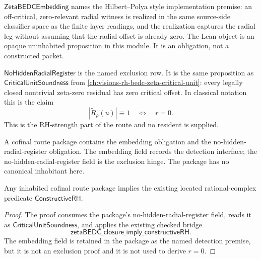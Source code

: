 \begin{definition}
\label{def:rh-layerwise-prime-cofinality-zeta-bedc-embedding}
$\mathsf{ZetaBEDCEmbedding}$ names the Hilbert--Polya style
implementation premise: an off-critical, zero-relevant radial witness is
realized in the same source-side classifier space as the finite layer
readings, and the realization captures the radial leg without assuming
that the radial offset is already zero. The Lean object is an opaque
uninhabited proposition in this module. It is an obligation, not a
constructed packet.
\end{definition}

\begin{definition}
\label{def:rh-layerwise-prime-cofinality-no-hidden-radial-register}
$\mathsf{NoHiddenRadialRegister}$ is the named exclusion row. It is the
same proposition as $\mathsf{CriticalUnitSoundness}$ from
\autoref{ch:visions-rh-bedc-zeta-critical-unit}: every legally closed
nontrivial zeta-zero residual has zero critical offset. In classical
notation this is the claim
$$
|\widetilde R_{\rho}(u)|\equiv 1
\quad\Longleftrightarrow\quad
r=0.
$$
This is the RH-strength part of the route and no resident is supplied.
\end{definition}

\begin{definition}
\label{def:rh-layerwise-prime-cofinality-route-package}
A cofinal route package contains the embedding obligation and the
no-hidden-radial-register obligation. The embedding field records the
detection interface; the no-hidden-radial-register field is the exclusion
hinge. The package has no canonical inhabitant here.
\end{definition}

\begin{theorem}
\label{thm:rh-layerwise-prime-cofinality-route-implies-rh}
Any inhabited cofinal route package implies the existing located
rational-complex predicate $\mathsf{ConstructiveRH}$.
\end{theorem}

\begin{proof}
The proof consumes the package's no-hidden-radial-register field, reads it
as $\mathsf{CriticalUnitSoundness}$, and applies the existing checked
bridge
$$
\mathsf{zetaBEDC\_closure\_imply\_constructiveRH}.
$$
The embedding field is retained in the package as the named detection
premise, but it is not an exclusion proof and it is not used to derive
$r=0$.
\end{proof}

